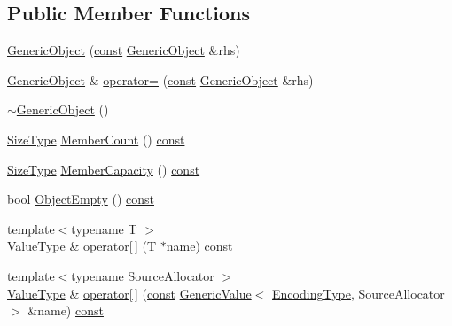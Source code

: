 \subsection*{Public Member Functions}
\begin{DoxyCompactItemize}
\item 
\mbox{\hyperlink{classrapidjson_1_1_generic_object_aae420e2eac920ff10d5c749f567e4905}{Generic\+Object}} (\mbox{\hyperlink{classrapidjson_1_1_generic_object_a3524fcb5f36c034aabd8afa19fc16d9e}{const}} \mbox{\hyperlink{classrapidjson_1_1_generic_object}{Generic\+Object}} \&rhs)
\item 
\mbox{\hyperlink{classrapidjson_1_1_generic_object}{Generic\+Object}} \& \mbox{\hyperlink{classrapidjson_1_1_generic_object_af94485b6c52b821203fe2c23a92c282f}{operator=}} (\mbox{\hyperlink{classrapidjson_1_1_generic_object_a3524fcb5f36c034aabd8afa19fc16d9e}{const}} \mbox{\hyperlink{classrapidjson_1_1_generic_object}{Generic\+Object}} \&rhs)
\item 
\mbox{\hyperlink{classrapidjson_1_1_generic_object_acd045fbc7ffebf7902244fb1034b8751}{$\sim$\+Generic\+Object}} ()
\item 
\mbox{\hyperlink{namespacerapidjson_a44eb33eaa523e36d466b1ced64b85c84}{Size\+Type}} \mbox{\hyperlink{classrapidjson_1_1_generic_object_a583962734202dfdf22ab851d78f24d92}{Member\+Count}} () \mbox{\hyperlink{classrapidjson_1_1_generic_object_a3524fcb5f36c034aabd8afa19fc16d9e}{const}}
\item 
\mbox{\hyperlink{namespacerapidjson_a44eb33eaa523e36d466b1ced64b85c84}{Size\+Type}} \mbox{\hyperlink{classrapidjson_1_1_generic_object_ae48a240f8168be407c6dd40864bee0f1}{Member\+Capacity}} () \mbox{\hyperlink{classrapidjson_1_1_generic_object_a3524fcb5f36c034aabd8afa19fc16d9e}{const}}
\item 
bool \mbox{\hyperlink{classrapidjson_1_1_generic_object_ad5ad0ae2038d629f17b10b2b11ced58b}{Object\+Empty}} () \mbox{\hyperlink{classrapidjson_1_1_generic_object_a3524fcb5f36c034aabd8afa19fc16d9e}{const}}
\item 
{\footnotesize template$<$typename T $>$ }\\\mbox{\hyperlink{classrapidjson_1_1_generic_object_a282660500748eff5ebab93b88a9d478f}{Value\+Type}} \& \mbox{\hyperlink{classrapidjson_1_1_generic_object_a158d16b9052e356436211158f2fb0638}{operator\mbox{[}$\,$\mbox{]}}} (T $\ast$name) \mbox{\hyperlink{classrapidjson_1_1_generic_object_a3524fcb5f36c034aabd8afa19fc16d9e}{const}}
\item 
{\footnotesize template$<$typename Source\+Allocator $>$ }\\\mbox{\hyperlink{classrapidjson_1_1_generic_object_a282660500748eff5ebab93b88a9d478f}{Value\+Type}} \& \mbox{\hyperlink{classrapidjson_1_1_generic_object_a920c32f4acd1f8a896c467777452595a}{operator\mbox{[}$\,$\mbox{]}}} (\mbox{\hyperlink{classrapidjson_1_1_generic_object_a3524fcb5f36c034aabd8afa19fc16d9e}{const}} \mbox{\hyperlink{classrapidjson_1_1_generic_value}{Generic\+Value}}$<$ \mbox{\hyperlink{classrapidjson_1_1_generic_object_ac412c8d073aa02f622b3904e4195425c}{Encoding\+Type}}, Source\+Allocator $>$ \&name) \mbox{\hyperlink{classrapidjson_1_1_generic_object_a3524fcb5f36c034aabd8afa19fc16d9e}{const}}

\end{DoxyCompactItemize}
